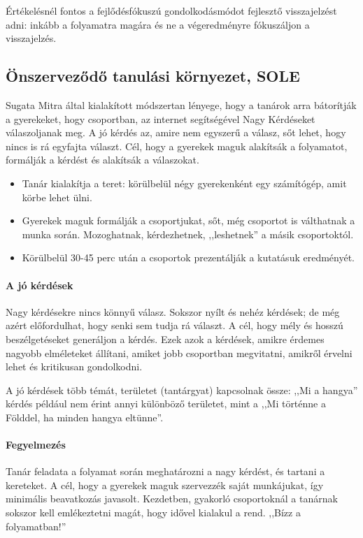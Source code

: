Értékelésnél fontos a fejlődésfókuszú gondolkodásmódot fejlesztő visszajelzést adni: inkább a folyamatra magára és ne a végeredményre fókuszáljon a visszajelzés.

\subsection{Önszerveződő tanulási környezet, SOLE}
Sugata Mitra által kialakított módszertan lényege, hogy a tanárok arra bátorítják a gyerekeket, hogy csoportban, az internet segítségével Nagy Kérdéseket válaszoljanak meg. A jó kérdés az, amire nem egyszerű a válasz, sőt lehet, hogy nincs is rá egyfajta választ. Cél, hogy a gyerekek maguk alakítsák a folyamatot, formálják a kérdést és alakítsák a válaszokat.

\begin{itemize}
  \item Tanár kialakítja a teret: körülbelül négy gyerekenként egy számítógép, amit körbe lehet ülni.
  \item Gyerekek maguk formálják a csoportjukat, sőt, még csoportot is válthatnak a munka során. Mozoghatnak, kérdezhetnek, ,,leshetnek'' a másik csoportoktól.
  \item Körülbelül 30-45 perc után a csoportok prezentálják a kutatásuk eredményét.
\end{itemize}



\paragraph{A jó kérdések}
Nagy kérdésekre nincs könnyű válasz. Sokszor nyílt és nehéz kérdések; de még azért előfordulhat, hogy senki sem tudja rá választ. A cél, hogy mély és hosszú beszélgetéseket generáljon a kérdés. Ezek azok a kérdések, amikre érdemes nagyobb elméleteket állítani, amiket jobb csoportban megvitatni, amikről érvelni lehet és kritikusan gondolkodni.

A jó kérdések több témát, területet (tantárgyat) kapcsolnak össze: ,,Mi a hangya'' kérdés például nem érint annyi különböző területet, mint a ,,Mi történne a Földdel, ha minden hangya eltünne''.

\paragraph{Fegyelmezés}
Tanár feladata a folyamat során meghatározni a nagy kérdést, és tartani a kereteket. A cél, hogy a gyerekek maguk szervezzék saját munkájukat, így minimális beavatkozás javasolt. Kezdetben, gyakorló csoportoknál a tanárnak sokszor kell emlékeztetni magát, hogy idővel kialakul a rend. ,,Bízz a folyamatban!''

